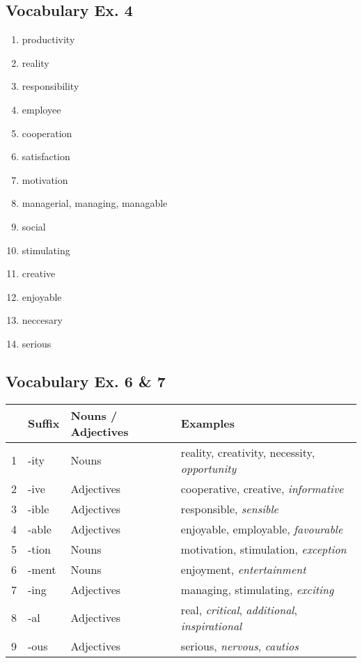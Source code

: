 \documentclass[12pt, a4paper, oneside]{article}
\begin{document}
  \subsection{Vocabulary Ex. 4}
  \begin{enumerate}[1.]
    \item productivity
    \item reality
    \item responsibility
    \item employee
    \item cooperation
    \item satisfaction
    \item motivation
    \item managerial, managing, managable
    \item social
    \item stimulating
    \item creative
    \item enjoyable
    \item neccesary
    \item serious
  \end{enumerate}

  \subsection{Vocabulary Ex. 6 \& 7}
  \begin{center}
    \begin{tabular}{|l|l|l|l|}
      \hline
      & Suffix & Nouns / Adjectives & Examples \\ \hline
      1 & -ity & Nouns & reality, creativity, necessity, \textit{opportunity} \\ \hline
      2 & -ive & Adjectives & cooperative, creative, \textit{informative} \\ \hline
      3 & -ible & Adjectives & responsible, \textit{sensible} \\ \hline
      4 & -able & Adjectives & enjoyable, employable, \textit{favourable} \\ \hline
      5 & -tion & Nouns & motivation, stimulation, \textit{exception} \\ \hline
      6 & -ment & Nouns & enjoyment, \textit{entertainment} \\ \hline
      7 & -ing & Adjectives & managing, stimulating, \textit{exciting} \\ \hline
      8 & -al & Adjectives & real, \textit{critical}, \textit{additional}, \textit{inspirational} \\ \hline 
      9 & -ous & Adjectives & serious, \textit{nervous}, \textit{cautios} \\ \hline
    \end{tabular}
  \end{center}
\end{document}
